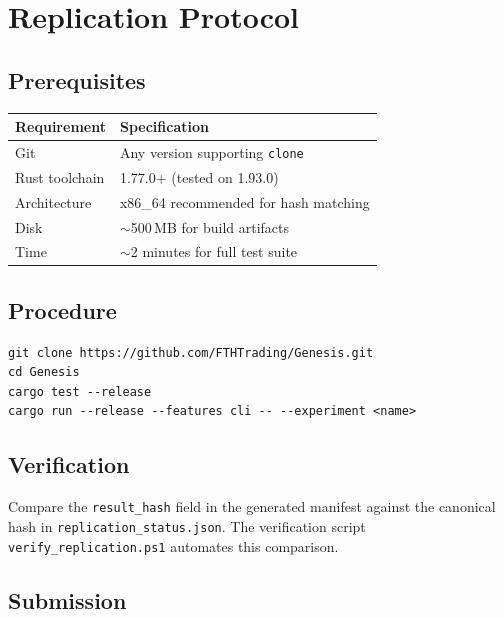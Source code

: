 \documentclass[11pt,a4paper]{article}
\begin{document}
\section{Replication Protocol}

\subsection{Prerequisites}

\begin{table}[H]
\centering
\begin{tabular}{@{}ll@{}}
\toprule
Requirement & Specification \\
\midrule
Git & Any version supporting \texttt{clone} \\
Rust toolchain & 1.77.0+ (tested on 1.93.0) \\
Architecture & x86\_64 recommended for hash matching \\
Disk & $\sim$500\,MB for build artifacts \\
Time & $\sim$2 minutes for full test suite \\
\bottomrule
\end{tabular}
\end{table}

\subsection{Procedure}

\begin{verbatim}
git clone https://github.com/FTHTrading/Genesis.git
cd Genesis
cargo test --release
cargo run --release --features cli -- --experiment <name>
\end{verbatim}

\subsection{Verification}

Compare the \texttt{result\_hash} field in the generated manifest against the canonical hash in \texttt{replication\_status.json}. The verification script \texttt{verify\_replication.ps1} automates this comparison.

\subsection{Submission}
\end{document}
